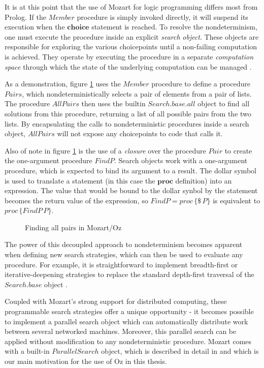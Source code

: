 It is at this point that the use of Mozart for logic programming differs
most from Prolog. If the $Member$ procedure is simply invoked directly,
it will suspend its execution when the $\mathbf{choice}$ statement
is reached. To resolve the nondeterminism, one must execute the procedure
inside an explicit \emph{search} \emph{object}. These objects are
responsible for exploring the various choicepoints until a non-failing
computation is achieved. They operate by executing the procedure in
a separate \emph{computation space} through which the state of the
underlying computation can be managed \citep{schulte00constraint_services}.

As a demonstration, figure \ref{fig:Background:All-Pairs} uses the
$Member$ procedure to define a procedure $Pairs$, which nondeterministically
selects a pair of elements from a pair of lists. The procedure $AllPairs$
then uses the builtin $Search.base.all$ object to find all solutions
from this procedure, returning a list of all possible pairs from the
two lists. By encapsulating the calls to nondeterministic procedures
inside a search object, $AllPairs$ will not expose any choicepoints
to code that calls it.

Also of note in figure \ref{fig:Background:All-Pairs} is the use
of a \emph{closure} over the procedure $Pair$ to create the one-argument
procedure $FindP$. Search objects work with a one-argument procedure,
which is expected to bind its argument to a result. The dollar symbol
is used to translate a statement (in this case the $\mathbf{proc}$
definition) into an expression. The value that would be bound to the
dollar synbol by the statement becomes the return value of the expression,
so $FindP=proc\,\{\$\, P\}$ is equivalent to $proc\,\{FindP\, P\}$.

%
\begin{figure}[t]

\caption{Finding all pairs in Mozart/Oz\label{fig:Background:All-Pairs}}

\end{figure}


The power of this decoupled approach to nondeterminism becomes apparent
when defining new search strategies, which can then be used to evaluate
any procedure. For example, it is straightforward to implement breadth-first
or iterative-deepening strategies to replace the standard depth-first
traversal of the $Search.base$ object \citep{schulte00constraint_services}.

Coupled with Mozart's strong support for distributed computing, these
programmable search strategies offer a unique opportunity - it becomes
possible to implement a parallel search object which can automatically
distribute work between several networked machines. Moreover, this
parallel search can be applied without modification to any nondeterministic
procedure. Mozart comes with a built-in $ParallelSearch$ object,
which is described in detail in \citep{schulte00oz_parallel} and
which is our main motivation for the use of Oz in this thesis.

